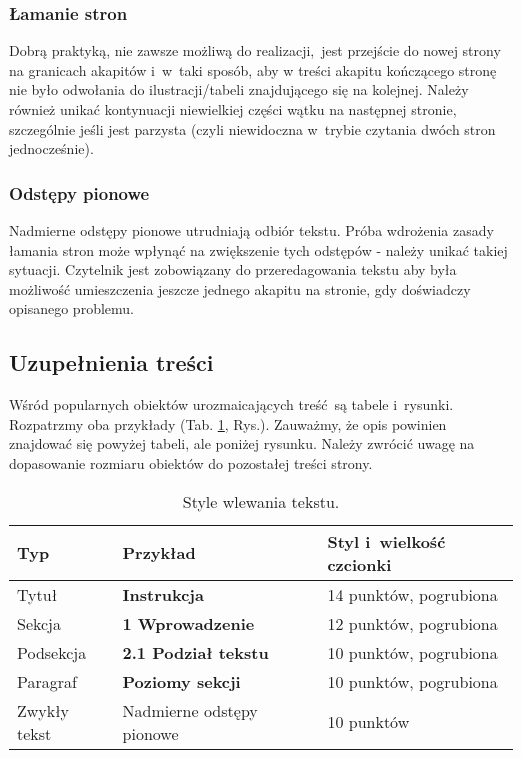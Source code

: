 \subsubsection{Łamanie stron}
\label{subsubsec:pagebreak}

Dobrą praktyką, nie zawsze możliwą do realizacji, jest przejście do nowej strony na granicach akapitów i~w~taki sposób, aby w treści akapitu kończącego stronę nie było odwołania do ilustracji/tabeli znajdującego się na kolejnej. Należy również unikać kontynuacji niewielkiej części wątku na następnej stronie, szczególnie jeśli jest parzysta (czyli niewidoczna w~trybie czytania dwóch stron jednocześnie).

\subsubsection{Odstępy pionowe}
\label{subsubsec:verticalSpace}

Nadmierne odstępy pionowe utrudniają odbiór tekstu. Próba wdrożenia zasady łamania stron może wpłynąć na zwiększenie tych odstępów - należy unikać takiej sytuacji. Czytelnik jest zobowiązany do przeredagowania tekstu aby była możliwość umieszczenia jeszcze jednego akapitu na stronie, gdy doświadczy opisanego problemu.

\subsection{Uzupełnienia treści}
\label{subsec:additions}

Wśród popularnych obiektów urozmaicających treść są tabele i~rysunki. Rozpatrzmy oba przykłady (Tab. \ref{tab:styles}, Rys.). Zauważmy, że opis powinien znajdować się powyżej tabeli, ale poniżej rysunku. Należy zwrócić uwagę na dopasowanie rozmiaru obiektów do pozostałej treści strony.

\begin{table}
	\vspace{-4mm}
	\caption{
		Style wlewania tekstu.
	}
	\begin{center}
		\begin{tabular}{lll}
			\hline
			Typ & Przykład & Styl i~wielkość czcionki\\
			\hline
			Tytuł & {\Large\bfseries Instrukcja} & 14 punktów, pogrubiona\\
			Sekcja &  {\large\bfseries 1 Wprowadzenie} & 12 punktów, pogrubiona\\
			Podsekcja & {\bfseries 2.1 Podział tekstu} & 10 punktów, pogrubiona\\
			Paragraf & {\bfseries Poziomy sekcji} & 10 punktów, pogrubiona\\
			Zwykły tekst & Nadmierne odstępy pionowe & 10 punktów\\
			\hline
		\end{tabular}
	\end{center}
	\label{tab:styles}
	\vspace{-6mm}
\end{table}

